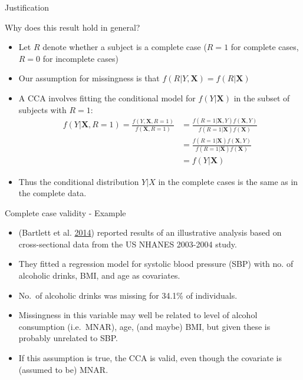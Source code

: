 \documentclass[ignorenonframetext,]{beamer}
\providecommand{\tightlist}{%
  \setlength{\itemsep}{0pt}\setlength{\parskip}{0pt}}
\begin{document}
\begin{frame}{Justification}
\protect\hypertarget{justification}{}

Why does this result hold in general?

\begin{itemize}
\tightlist
\item
  Let \(R\) denote whether a subject is a complete case (\(R=1\) for
  complete cases, \(R=0\) for incomplete cases)
\item
  Our assumption for missingness is that
  \(f(R|Y,\mathbf X)=f(R|\mathbf X)\)
\item
  A CCA involves fitting the conditional model for \(f(Y|\mathbf X)\) in
  the subset of subjects with \(R=1\): \[
  \begin{aligned}
  f(Y|\mathbf X,R=1) = \frac{f(Y,\mathbf X,R=1)}{f(\mathbf X,R=1)} &= \frac{f(R=1|\mathbf X,Y)f(\mathbf X,Y)}{f(R=1|\mathbf X)f(\mathbf X)} \\
    &= \frac{f(R=1|\mathbf X) f(\mathbf X,Y)}{f(R=1|\mathbf X) f(\mathbf X)} \\
    &= f(Y|\mathbf X)
  \end{aligned}
  \]
\item
  Thus the conditional distribution \(Y|X\) in the complete cases is the
  same as in the complete data.
\end{itemize}

\end{frame}

\begin{frame}{Complete case validity - Example}
\protect\hypertarget{complete-case-validity---example}{}

\begin{itemize}
\tightlist
\item
  (Bartlett et al. \protect\hyperlink{ref-Bartlett2014a}{2014}) reported
  results of an illustrative analysis based on cross-sectional data from
  the US NHANES 2003-2004 study.
\item
  They fitted a regression model for systolic blood pressure (SBP) with
  no. of alcoholic drinks, BMI, and age as covariates.
\item
  No.~of alcoholic drinks was missing for 34.1\% of individuals.
\item
  Missingness in this variable may well be related to level of alcohol
  consumption (i.e.~MNAR), age, (and maybe) BMI, but given these is
  probably unrelated to SBP.
\item
  If this assumption is true, the CCA is valid, even though the
  covariate is (assumed to be) MNAR.
\end{itemize}

\end{frame}
\end{document}
